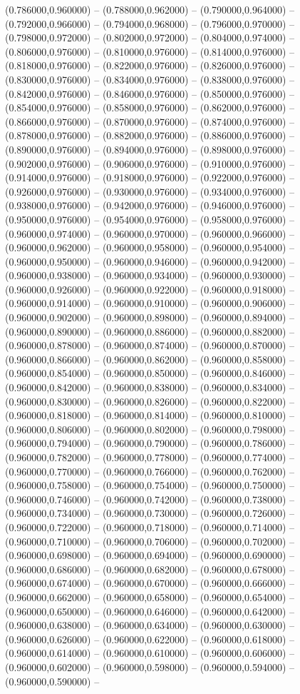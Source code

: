 (0.786000,0.960000) -- (0.788000,0.962000) -- (0.790000,0.964000) -- (0.792000,0.966000) -- (0.794000,0.968000) -- (0.796000,0.970000) -- (0.798000,0.972000) -- (0.802000,0.972000) -- (0.804000,0.974000) -- (0.806000,0.976000) -- (0.810000,0.976000) -- (0.814000,0.976000) -- (0.818000,0.976000) -- (0.822000,0.976000) -- (0.826000,0.976000) -- (0.830000,0.976000) -- (0.834000,0.976000) -- (0.838000,0.976000) -- (0.842000,0.976000) -- (0.846000,0.976000) -- (0.850000,0.976000) -- (0.854000,0.976000) -- (0.858000,0.976000) -- (0.862000,0.976000) -- (0.866000,0.976000) -- (0.870000,0.976000) -- (0.874000,0.976000) -- (0.878000,0.976000) -- (0.882000,0.976000) -- (0.886000,0.976000) -- (0.890000,0.976000) -- (0.894000,0.976000) -- (0.898000,0.976000) -- (0.902000,0.976000) -- (0.906000,0.976000) -- (0.910000,0.976000) -- (0.914000,0.976000) -- (0.918000,0.976000) -- (0.922000,0.976000) -- (0.926000,0.976000) -- (0.930000,0.976000) -- (0.934000,0.976000) -- (0.938000,0.976000) -- (0.942000,0.976000) -- (0.946000,0.976000) -- (0.950000,0.976000) -- (0.954000,0.976000) -- (0.958000,0.976000) -- (0.960000,0.974000) -- (0.960000,0.970000) -- (0.960000,0.966000) -- (0.960000,0.962000) -- (0.960000,0.958000) -- (0.960000,0.954000) -- (0.960000,0.950000) -- (0.960000,0.946000) -- (0.960000,0.942000) -- (0.960000,0.938000) -- (0.960000,0.934000) -- (0.960000,0.930000) -- (0.960000,0.926000) -- (0.960000,0.922000) -- (0.960000,0.918000) -- (0.960000,0.914000) -- (0.960000,0.910000) -- (0.960000,0.906000) -- (0.960000,0.902000) -- (0.960000,0.898000) -- (0.960000,0.894000) -- (0.960000,0.890000) -- (0.960000,0.886000) -- (0.960000,0.882000) -- (0.960000,0.878000) -- (0.960000,0.874000) -- (0.960000,0.870000) -- (0.960000,0.866000) -- (0.960000,0.862000) -- (0.960000,0.858000) -- (0.960000,0.854000) -- (0.960000,0.850000) -- (0.960000,0.846000) -- (0.960000,0.842000) -- (0.960000,0.838000) -- (0.960000,0.834000) -- (0.960000,0.830000) -- (0.960000,0.826000) -- (0.960000,0.822000) -- (0.960000,0.818000) -- (0.960000,0.814000) -- (0.960000,0.810000) -- (0.960000,0.806000) -- (0.960000,0.802000) -- (0.960000,0.798000) -- (0.960000,0.794000) -- (0.960000,0.790000) -- (0.960000,0.786000) -- (0.960000,0.782000) -- (0.960000,0.778000) -- (0.960000,0.774000) -- (0.960000,0.770000) -- (0.960000,0.766000) -- (0.960000,0.762000) -- (0.960000,0.758000) -- (0.960000,0.754000) -- (0.960000,0.750000) -- (0.960000,0.746000) -- (0.960000,0.742000) -- (0.960000,0.738000) -- (0.960000,0.734000) -- (0.960000,0.730000) -- (0.960000,0.726000) -- (0.960000,0.722000) -- (0.960000,0.718000) -- (0.960000,0.714000) -- (0.960000,0.710000) -- (0.960000,0.706000) -- (0.960000,0.702000) -- (0.960000,0.698000) -- (0.960000,0.694000) -- (0.960000,0.690000) -- (0.960000,0.686000) -- (0.960000,0.682000) -- (0.960000,0.678000) -- (0.960000,0.674000) -- (0.960000,0.670000) -- (0.960000,0.666000) -- (0.960000,0.662000) -- (0.960000,0.658000) -- (0.960000,0.654000) -- (0.960000,0.650000) -- (0.960000,0.646000) -- (0.960000,0.642000) -- (0.960000,0.638000) -- (0.960000,0.634000) -- (0.960000,0.630000) -- (0.960000,0.626000) -- (0.960000,0.622000) -- (0.960000,0.618000) -- (0.960000,0.614000) -- (0.960000,0.610000) -- (0.960000,0.606000) -- (0.960000,0.602000) -- (0.960000,0.598000) -- (0.960000,0.594000) -- (0.960000,0.590000) -- 